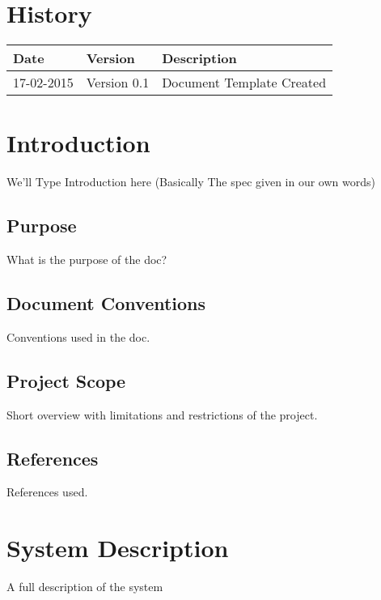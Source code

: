 \documentclass[12pt]{article}
\begin{document}


\section{History}
\begin{tabular}{|l|l|l|}

\hline
Date & Version & Description\\ %
\hline
17-02-2015 & Version 0.1 & Document Template Created\\ %

\end{tabular}

\tableofcontents

\newpage

\section{Introduction}
We'll Type Introduction here (Basically The spec given in our own words)

\subsection{Purpose}
What is the purpose of the doc?	

\subsection{Document Conventions}
Conventions used in the doc.

\subsection{Project Scope}
Short overview with limitations and restrictions of the project.

\subsection{References}
References used.

\section{System Description}
A full description of the system
\end{document}

